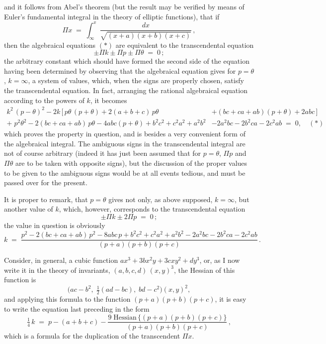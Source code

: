 \documentclass[11pt]{article}
\begin{document}
and it follows from Abel's theorem (but the result may be verified by means of Euler's fundamental integral in the theory of elliptic functions), that if
\[
\Pi x \;=\; \int_{\infty}^{x}\!\frac{dx}{\sqrt{(x + a)(x + b)(x + c)}}\,,
\]
then the algebraical equations $(*)$ are equivalent to the transcendental equation
\[
\pm \Pi k \pm \Pi p \pm \Pi \theta \;=\; 0\,;
\]
the arbitrary constant which should have formed the second side of the equation having been determined by observing that the algebraical equation gives for $p = \theta$, $k = \infty$, a system of values, which, when the signs are properly chosen, satisfy the transcendental equation. In fact, arranging the rational algebraical equation according to the powers of $k$, it becomes
\begin{align*}
k^{2}\,(p - \theta)^{2} - 2 k\,\bigl[\,p\theta\,(p + \theta) + 2(a + b + c)\,p\theta &+ (bc + ca + ab)(p + \theta) + 2abc\,\bigr]\\[2pt]
+\; p^{2}\theta^{2} - 2(bc + ca + ab)\,p\theta - 4abc(p + \theta) + b^{2}c^{2} + c^{2}a^{2} + a^{2}b^{2}
&- 2a^{2}bc - 2b^{2}ca - 2c^{2}ab \;=\; 0,\quad(*)
\end{align*}
which proves the property in question, and is besides a very convenient form of the algebraical integral. The ambiguous signs in the transcendental integral are not of course arbitrary (indeed it has just been assumed that for $p = \theta$, $\Pi p$ and $\Pi\theta$ are to be taken with opposite signs), but the discussion of the proper values to be given to the ambiguous signs would be at all events tedious, and must be passed over for the present.

It is proper to remark, that $p = \theta$ gives not only, as above supposed, $k = \infty$, but another value of $k$, which, however, corresponds to the transcendental equation
\[
\pm \Pi k \pm 2 \Pi p \;=\; 0\,;
\]
the value in question is obviously
\[
k \;=\; \frac{p^{2} - 2(bc + ca + ab)\,p^{2} - 8abc\,p + b^{2}c^{2} + c^{2}a^{2} + a^{2}b^{2} - 2a^{2}bc - 2b^{2}ca - 2c^{2}ab}{(p + a)(p + b)(p + c)}\,.
\]

Consider, in general, a cubic function $ax^{3} + 3 b x^{2} y + 3 c x y^{2} + d y^{3}$, or, as I now write it in the theory of invariants, $(a, b, c, d)\,(x, y)^{3}$, the Hessian of this function is
\[
\bigl(ac - b^{2},\;\tfrac{1}{2}(ad - bc),\; bd - c^{2}\bigr)(x, y)^{2},
\]
and applying this formula to the function $(p + a)(p + b)(p + c)$, it is easy to write the equation last preceding in the form
\[
\tfrac{1}{4}\,k \;=\; p - (a + b + c) - \frac{9\;\text{Hessian}\,\{(p + a)(p + b)(p + c)\}}{(p + a)(p + b)(p + c)}\,,
\]
which is a formula for the duplication of the transcendent $\Pi x$.
\end{document}
